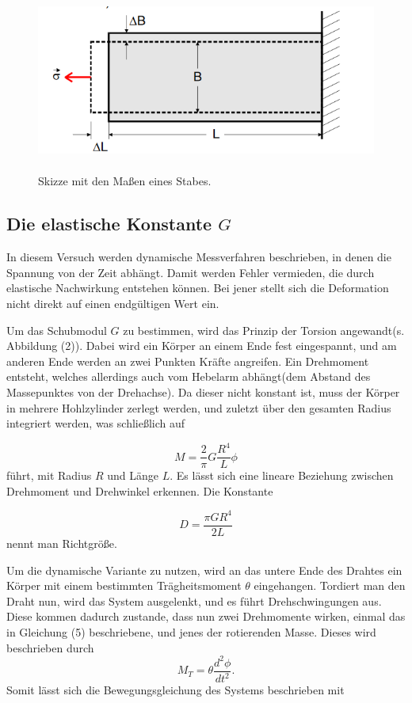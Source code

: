 \begin{figure}[H]
 \centering
  \includegraphics[height=6cm]{Screenshot (7).png}
  \caption{Skizze mit den Maßen eines Stabes.\cite{kent}}
  \label{fig:drill}
\end{figure}


\subsection{Die elastische Konstante $G$}

In diesem Versuch werden dynamische Messverfahren beschrieben, in denen die Spannung von der Zeit abhängt.
Damit werden Fehler vermieden, die durch elastische Nachwirkung entstehen können. Bei jener stellt sich die Deformation nicht direkt auf einen endgültigen Wert ein.

\noindent Um das Schubmodul $G$ zu bestimmen, wird das Prinzip der Torsion angewandt(s. Abbildung (2)). Dabei wird ein Körper an einem Ende fest eingespannt, und am anderen Ende werden an zwei Punkten Kräfte angreifen.
Ein Drehmoment entsteht, welches allerdings auch vom Hebelarm abhängt(dem Abstand des Massepunktes von der Drehachse).
Da dieser nicht konstant ist, muss der Körper in mehrere Hohlzylinder zerlegt werden, und zuletzt über den gesamten Radius integriert werden, was  schließlich auf

\begin{equation}
  M = \frac{2}{\pi}G\frac{R^{4}}{L}\phi
\end{equation}
führt, mit Radius $R$ und Länge $L$. Es lässt sich eine lineare Beziehung zwischen Drehmoment und Drehwinkel erkennen.
Die Konstante 

\begin{equation}
  D = \frac{\pi G R^{4}}{2L}
\end{equation}
nennt man Richtgröße.

\noindent Um die dynamische Variante zu nutzen, wird an das untere Ende des Drahtes ein Körper mit einem bestimmten Trägheitsmoment $\theta$
eingehangen. Tordiert man den Draht nun, wird das System ausgelenkt, und es führt Drehschwingungen aus.
Diese kommen dadurch zustande, dass nun zwei Drehmomente wirken, einmal das in Gleichung (5) beschriebene, und jenes der rotierenden Masse.
Dieses wird beschrieben durch
\begin{equation}
  M_T = \theta \frac{d^{2}\phi}{dt^{2}} .
\end{equation}
Somit lässt sich die Bewegungsgleichung des Systems beschrieben mit

